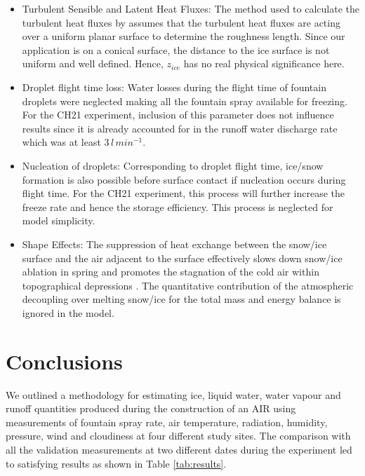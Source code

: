 \documentclass[utf8]{frontiersSCNS} %
\begin{document}
\begin{itemize}

\item  Turbulent Sensible and Latent Heat Fluxes: The method used to calculate the turbulent heat fluxes by
  \cite{Garratt_1992} assumes that the turbulent heat fluxes are acting over a uniform planar surface to determine the
  roughness length. Since our application is on a conical surface, the distance to the ice surface is not
  uniform and well defined. Hence, $z_{ice}$ has no real physical significance here.

\item Droplet flight time loss: Water losses during the flight time of fountain droplets were neglected making all the
  fountain spray available for freezing. For the CH21 experiment, inclusion of this parameter does not influence
  results since it is already accounted for in the runoff water discharge rate which was at least $3\, l\,min^{-1}$.

\item Nucleation of droplets: Corresponding to droplet flight time, ice/snow formation is also possible before surface
  contact if nucleation occurs during flight time. For the CH21 experiment, this process will further increase
  the freeze rate and hence the storage efficiency. This process is neglected for model simplicity.
\item Shape Effects: The suppression of heat exchange between the snow/ice surface and the air adjacent to the surface
  effectively slows down snow/ice ablation in spring and promotes the stagnation of the cold air within topographical
  depressions \citep{Fujita_2010}. The quantitative contribution of the atmospheric decoupling over melting snow/ice
  for the total mass and energy balance is ignored in the model.

\end{itemize}

\section{Conclusions} 
We outlined a methodology for estimating ice, liquid water, water vapour and runoff quantities produced during the
construction of an AIR using measurements of fountain spray rate, air temperature, radiation, humidity, pressure,
wind and cloudiness at four different study sites. The comparison with all the validation measurements at two different
dates during the experiment led to satisfying results as shown in Table \ref{tab:results}.
\end{document}
